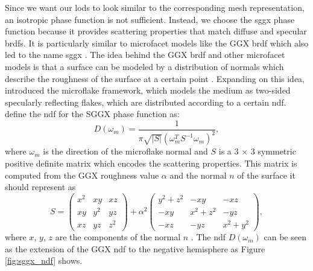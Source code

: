 Since we want our \acp{lod} to look similar to the corresponding mesh representation, an isotropic phase function is not sufficient.
Instead, we choose the \acs{sggx} phase function \cite{sggx} because it provides scattering properties that match diffuse and specular \acsp{brdf}.
It is particularly similar to microfacet models like the GGX \acs{brdf} \cite{ggx} which also led to the name \acf{sggx} \cite{sggx}.
The idea behind the GGX \ac{brdf} and other microfacet models is that a surface can be modeled by a distribution of normals which describe the roughness of the surface at a certain point \cite{ggx}.
Expanding on this idea, \citeauthor{microflake} \cite{microflake} introduced the microflake framework, which models the medium as two-sided specularly reflecting flakes, which are distributed according to a certain \ac{ndf}.
\citeauthor{sggx} \cite{sggx} define the \ac{ndf} for the SGGX phase function as:
\begin{equation*}
    D(\omega_m)=\frac{1}{\pi \sqrt{|S|}(\omega_m^T S^{-1} \omega_m)^2},
\end{equation*}
where $\omega_m$ is the direction of the microflake normal and $S$ is a 3 $\times$ 3 symmetric positive definite matrix which encodes the scattering properties.
This matrix is computed from the GGX roughness value $\alpha$ and the normal $n$ of the surface it should represent as
\begin{equation*}
    S=\begin{pmatrix}x^2 & xy & xz \\ xy & y^2 & yz \\ xz & yz & z^2\end{pmatrix} + \alpha^2\begin{pmatrix}y^2 + z^2 & -xy & -xz \\ -xy & x^2+z^2 & -yz \\ -xz & -yz & x^2+y^2\end{pmatrix},
\end{equation*}
where $x$, $y$, $z$ are the components of the normal $n$ \cite{sggx}.
The \ac{ndf} $D(\omega_m)$ can be seen as the extension of the GGX \acs{ndf} to the negative hemisphere as Figure \ref{fig:sggx_ndf} shows.
